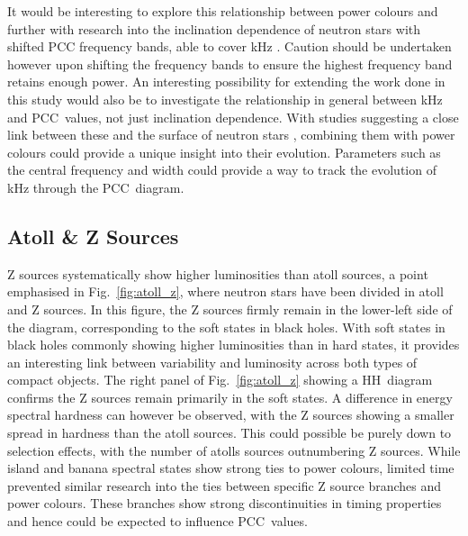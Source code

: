 It would be interesting to explore this relationship between power colours and \QPOs further with research into the inclination dependence of neutron stars with shifted \ac{PCC} frequency bands, able to cover kHz \QPOs. Caution should be undertaken however upon shifting the frequency bands to ensure the highest frequency band retains enough power. An interesting possibility for extending the work done in this study would also be to investigate the relationship in general between kHz \QPOs and \ac{PCC}~values, not just inclination dependence. With studies suggesting a close link between these \QPOs and the surface of neutron stars \citep[e.g.][]{peille2015spectral}, combining them with power colours could provide a unique insight into their evolution. Parameters such as the central frequency and width could provide a way to track the evolution of kHz \QPOs through the \ac{PCC}~diagram. \\

\subsection{Atoll \& Z Sources}
\label{sec:dis_nsaz}
Z sources systematically show higher luminosities than atoll sources, a point emphasised in Fig.~\ref{fig:atoll_z}, where neutron stars have been divided in atoll and Z sources. In this figure, the Z sources firmly remain in the lower-left side of the diagram, corresponding to the soft states in black holes. With soft states  in black holes commonly showing higher luminosities than in hard states, it provides an interesting link between variability and luminosity across both types of compact objects. The right panel of Fig.~\ref{fig:atoll_z} showing a \ac{HH}~diagram confirms the Z sources remain primarily in the soft states. A difference in energy spectral hardness can however be observed, with the Z sources showing a smaller spread in hardness than the atoll sources. This could possible be purely down to selection effects, with the number of atolls sources outnumbering Z sources. While island and banana spectral states show strong ties to power colours, limited time prevented similar research into the ties between specific Z source branches and power colours. These branches show strong discontinuities in timing properties \citep{hasinger1989two} and hence could be expected to influence \ac{PCC}~values.\\

